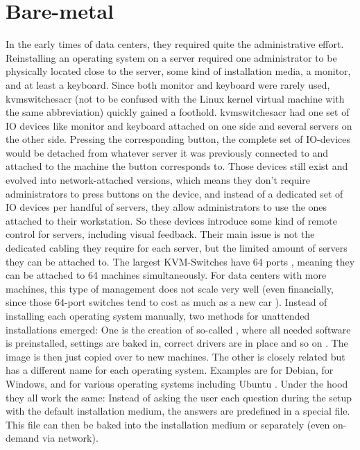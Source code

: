 \section{Bare-metal}
In the early times of data centers, they required quite the administrative effort. Reinstalling an operating system on a server required one administrator to be physically located close to the server, some kind of installation media, a monitor, and at least a keyboard. Since both monitor and keyboard were rarely used, \gls{kvmswitchesacr} (not to be confused with the Linux kernel virtual machine with the same abbreviation) quickly gained a foothold. \Gls{kvmswitchesacr} had one set of IO devices like monitor and keyboard attached on one side and several servers on the other side. Pressing the corresponding button, the complete set of IO-devices would be  detached from whatever server it was previously connected to and attached to the machine the button corresponds to.
\newline
Those devices still exist and evolved into network-attached versions, which means they don't require administrators to press buttons on the device, and instead of a dedicated set of IO devices per handful of servers, they allow administrators to use the ones attached to their workstation. So these devices introduce some kind of remote control for servers, including visual feedback.
Their main issue is not the dedicated cabling they require for each server, but the limited amount of servers they can be attached to. The largest KVM-Switches have 64 ports \cite{64_port_kvm_switches}, meaning they can be attached to 64 machines simultaneously. For data centers with more machines, this type of management does not scale very well (even financially, since those 64-port switches tend to cost as much as a new car \cite{64_port_kvm_switches}).
\newline
Instead of installing each operating system manually, two methods for unattended installations emerged: One is the creation of so-called , where all needed software is preinstalled, settings are baked in, correct drivers are in place and so on \cite{what_golden_image}. The image is then just copied over to new machines. The other is closely related but has a different name for each operating system. Examples are  for Debian,  for Windows, and  for various operating systems including Ubuntu \cite{cloud_init_releases}. Under the hood they all work the same: Instead of asking the user each question during the setup with the default installation medium, the answers are predefined in a special file. This file can then be baked into the installation medium or separately (even on-demand via network).
